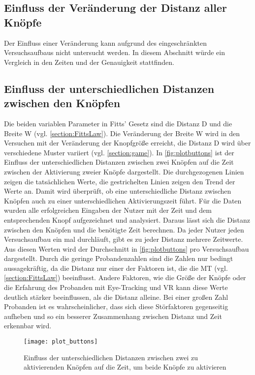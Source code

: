 \subsection{Einfluss der Veränderung der Distanz aller Knöpfe}
Der Einfluss einer Veränderung kann aufgrund des eingeschränkten Versuchsaufbaus nicht untersucht werden. In diesem Abschnitt würde ein Vergleich in den Zeiten und der Genauigkeit stattfinden.

\subsection{Einfluss der unterschiedlichen Distanzen zwischen den Knöpfen}
Die beiden variablen Parameter in Fitts' Gesetz sind die Distanz D und die Breite W (vgl. \autoref{section:FittsLaw}). Die Veränderung der Breite W wird in den Versuchen mit der Veränderung der Knopfgröße erreicht, die Distanz D wird über verschiedene Muster variiert (vgl. \autoref{section:game}). In \autoref{fig:plotbuttons} ist der Einfluss der unterschiedlichen Distanzen zwischen zwei Knöpfen auf die Zeit zwischen der Aktivierung zweier Knöpfe dargestellt. Die durchgezogenen Linien zeigen die tatsächlichen Werte, die gestrichelten Linien zeigen den Trend der Werte an. Damit wird überprüft, ob eine unterschiedliche Distanz zwischen Knöpfen auch zu einer unterschiedlichen Aktivierungszeit führt. Für die Daten wurden alle erfolgreichen Eingaben der Nutzer mit der Zeit und dem entsprechenden Knopf aufgezeichnet und analysiert. Daraus lässt sich die Distanz zwischen den Knöpfen und die benötigte Zeit berechnen. Da jeder Nutzer jeden Versuchsaufbau ein mal durchläuft, gibt es zu jeder Distanz mehrere Zeitwerte. Aus diesen Werten wird der Durchschnitt in \autoref{fig:plotbuttons} pro Versuchsaufbau dargestellt. Durch die geringe Probandenzahlen sind die Zahlen nur bedingt aussagekräftig, da die Distanz nur einer der Faktoren ist, die die \ac{MT} (vgl. \autoref{section:FittsLaw}) beeinflusst. Andere Faktoren, wie die Größe der Knöpfe oder die Erfahrung des Probanden mit Eye-Tracking und \ac{VR} kann diese Werte deutlich stärker beeinflussen, als die Distanz alleine. Bei einer großen Zahl Probanden ist es wahrscheinlicher, dass sich diese Störfaktoren gegenseitig aufheben und so ein besserer Zusammenhang zwischen Distanz und Zeit erkennbar wird. 
\begin{figure}[!htbp]
	\centering
	\texttt{[image: plot\_buttons]}
	\caption[Einfluss der unterschiedlichen Distanzen zwischen zwei zu aktivierenden Knöpfen auf die Zeit, um beide Knöpfe zu aktivieren]{Einfluss der unterschiedlichen Distanzen zwischen zwei zu aktivierenden Knöpfen auf die Zeit, um beide Knöpfe zu aktivieren}
	\label{fig:plotbuttons}
\end{figure}
